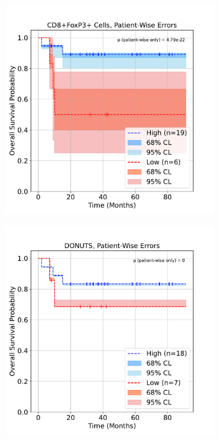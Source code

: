 \documentclass[article]{jss}
\begin{document}
\begin{figure}[p]
\begin{subfigure}[t]{0.49\textwidth}
    \caption{\label{fig:lung-dataset-donuts}}
  \end{subfigure} \\
  \vspace{\spacebetweenrows}
  \begin{subfigure}[t]{0.49\textwidth}
    \centering
    \includegraphics[width=\linewidth]{lung_cells_km_OS_patient_wise.pdf}
    \caption{\label{fig:lung-dataset-cells-patient-wise}}
  \end{subfigure}
  \begin{subfigure}[t]{0.49\textwidth}
    \centering
    \includegraphics[width=\linewidth]{lung_donuts_km_OS_patient_wise.pdf}

\end{subfigure}
\end{figure}
\end{document}
